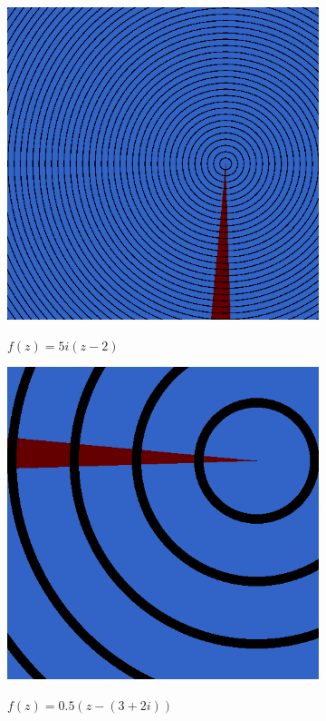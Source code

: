 \documentclass[xhtml, mathjax]{article}
\begin{document}
    \begin{figure}
      \centering
      \begin{subfigure}{0.5\linewidth}
        \centering
        \includegraphics{linear_1.gif}\par
        $f(z)=5i(z-2)$
      \end{subfigure}
      \begin{subfigure}{0.5\linewidth}
        \centering
        \includegraphics{linear_2.gif}\par
        $f(z)=0.5(z-(3+2i))$
      \end{subfigure}
    \end{figure}
\end{document}
